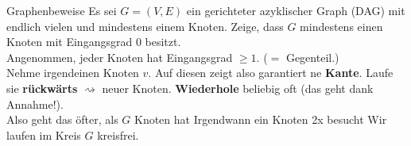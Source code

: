 \begin{frame}{Graphenbeweise}
	Es sei $G = (V, E)$ ein gerichteter azyklischer Graph (DAG) mit endlich vielen und mindestens einem Knoten. Zeige, dass $G$ mindestens einen Knoten mit Eingangsgrad 0 besitzt. \\
	\pause
	\bigskip
	\solutionheading
	Angenommen, jeder Knoten hat Eingangsgrad $\geq 1$. ($=$ Gegenteil.) \\ 
	Nehme irgendeinen Knoten $v$. Auf diesen zeigt also garantiert ne \textbf{Kante}. Laufe sie \textbf{rückwärts} $\rightsquigarrow$ neuer Knoten. \textbf{Wiederhole} beliebig oft (das geht dank Annahme!). \\
	Also geht das öfter, als $G$ Knoten hat \impl Irgendwann ein Knoten 2x besucht \impl Wir laufen im Kreis \impl \crash $G$ kreisfrei. 
\end{frame}



